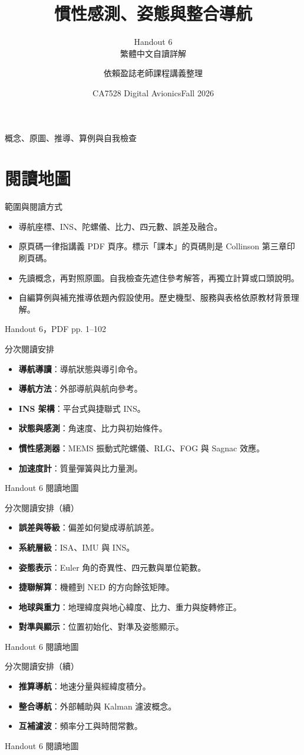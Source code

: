 \documentclass[aspectratio=169,11pt]{beamer}
\title{慣性感測、姿態與整合導航}
\subtitle{Handout 6\\繁體中文自讀詳解}
\author{依賴盈誌老師課程講義整理}
\date{CA7528 Digital Avionics\quad Fall 2026}
\newcommand{\src}[1]{\par\vfill{\scriptsize\color{teal}#1}}
\newcommand{\slide}[3]{\begin{frame}[t]{#1}#3\src{#2}\end{frame}}
\newcommand{\bi}{\begin{itemize}\setlength{\itemsep}{5pt}}
\newcommand{\ei}{\end{itemize}}
\begin{document}
\begin{frame}\titlepage\centering\small 概念、原圖、推導、算例與自我檢查\end{frame}
\section{閱讀地圖}
\slide{範圍與閱讀方式}{Handout 6，PDF pp. 1--102}{
\bi
\item 導航座標、INS、陀螺儀、比力、四元數、誤差及融合。
\item 原頁碼一律指講義 PDF 頁序。標示「課本」的頁碼則是 Collinson 第三章印刷頁碼。
\item 先讀概念，再對照原圖。自我檢查先遮住參考解答，再獨立計算或口頭說明。
\item 自編算例與補充推導依題內假設使用。歷史機型、服務與表格依原教材背景理解。
\ei
}
\slide{分次閱讀安排}{Handout 6 閱讀地圖}{
\small
\bi
\item \textbf{導航導讀}：導航狀態與導引命令。
\item \textbf{導航方法}：外部導航與航向參考。
\item \textbf{INS 架構}：平台式與捷聯式 INS。
\item \textbf{狀態與感測}：角速度、比力與初始條件。
\item \textbf{慣性感測器}：MEMS 振動式陀螺儀、RLG、FOG 與 Sagnac 效應。
\item \textbf{加速度計}：質量彈簧與比力量測。
\ei
}
\slide{分次閱讀安排（續）}{Handout 6 閱讀地圖}{
\small
\bi
\item \textbf{誤差與等級}：偏差如何變成導航誤差。
\item \textbf{系統層級}：ISA、IMU 與 INS。
\item \textbf{姿態表示}：Euler 角的奇異性、四元數與單位範數。
\item \textbf{捷聯解算}：機體到 NED 的方向餘弦矩陣。
\item \textbf{地球與重力}：地理緯度與地心緯度、比力、重力與旋轉修正。
\item \textbf{對準與顯示}：位置初始化、對準及姿態顯示。
\ei
}
\slide{分次閱讀安排（續）}{Handout 6 閱讀地圖}{
\small
\bi
\item \textbf{推算導航}：地速分量與經緯度積分。
\item \textbf{整合導航}：外部輔助與 Kalman 濾波概念。
\item \textbf{互補濾波}：頻率分工與時間常數。
\ei
}
\end{document}
